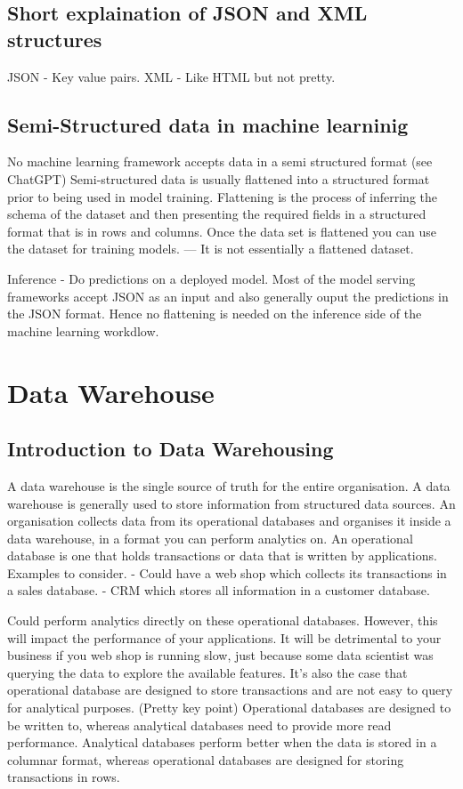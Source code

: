 \documentclass[a4paper, 11pt]{article}
\begin{document}
    \subsection{Short explaination of JSON and XML structures}
    JSON - Key value pairs.
    XML - Like HTML but not pretty.

    \subsection{Semi-Structured data in machine learninig}
    No machine learning framework accepts data in a semi structured format (see ChatGPT)
    Semi-structured data is usually flattened into a structured format prior to being used in model training.
    Flattening is the process of inferring the schema of the dataset and then presenting the required fields in a structured format that is in rows and columns.
    Once the data set is flattened you can use the dataset for training models.
    --- It is not essentially a flattened dataset.

    Inference
    - Do predictions on a deployed model.
    Most of the model serving frameworks accept JSON as an input and also generally ouput the predictions in the JSON format.
    Hence no flattening is needed on the inference side of the machine learning workdlow.



    \section{Data Warehouse}

    \subsection{Introduction to Data Warehousing}
    A data warehouse is the single source of truth for the entire organisation.
    A data warehouse is generally used to store information from structured data sources.
    An organisation collects data from its operational databases and organises it inside a data warehouse, in a format you can perform analytics on.
    An operational database is one that holds transactions or data that is written by applications.
    Examples to consider.
    - Could have a web shop which collects its transactions in a sales database.
    - CRM which stores all information in a customer database.

    Could perform analytics directly on these operational databases.
    However, this will impact the performance of your applications.
    It will be detrimental to your business if you web shop is running slow, just because some data scientist was querying the data to explore the available features.
    It's also the case that operational database are designed to store transactions and are not easy to query for analytical purposes. (Pretty key point)
    Operational databases are designed to be written to, whereas analytical databases need to provide more read performance.
    Analytical databases perform better when the data is stored in a columnar format, whereas operational databases are designed for storing transactions in rows.
\end{document}
